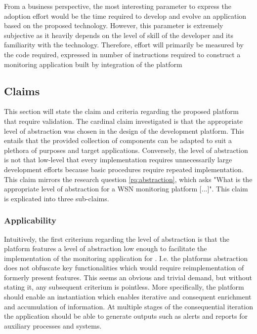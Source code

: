 From a business perspective, the most interesting parameter to express the adoption effort would be the time required to develop and evolve an application based on the proposed technology. However, this parameter is extremely subjective as it heavily depends on the level of skill of the developer and its familiarity with the technology. Therefore, effort will primarily be measured by the code required, expressed in number of instructions required to construct a monitoring application built by integration of the platform

\subsection{Claims}
\label{sec:claims}
This section will state the claim and criteria regarding the proposed platform that require validation. The cardinal claim investigated is that the appropriate level of abstraction was chosen in the design of the development platform. This entails that the provided collection of components can be adapted to suit a plethora of purposes and target applications. Conversely, the level of abstraction is not that low-level that every implementation requires unnecessarily large development efforts because basic procedures require repeated implementation. This claim mirrors the research question \ref{rq:abstraction}, which asks "What is the appropriate level of abstraction for a WSN monitoring platform [...]". This claim is explicated into three sub-claims.

\subsubsection{Applicability}
Intuitively, the first criterium regarding the level of abstraction is that the platform features a level of abstraction low enough to facilitate the implementation of the monitoring application for \sensit. I.e. the platforms abstraction does not obfuscate key functionalities which would require reimplementation of formerly present features. This seems an obvious and trivial demand, but without stating it, any subsequent criterium is pointless. More specifically, the platform should enable an instantiation which enables iterative and consequent enrichment and accumulation of information. At multiple stages of the consequential iteration the application should be able to generate outputs such as alerts and reports for auxiliary processes and systems.

